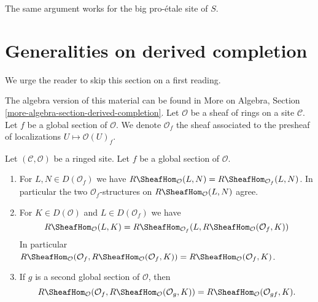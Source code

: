 \medskip\noindent
The same argument works for the big pro-\'etale site of $S$.







\section{Generalities on derived completion}
\label{section-derived-completion}

\noindent
We urge the reader to skip this section on a first reading.

\medskip\noindent
The algebra version of this material can be found in
More on Algebra, Section \ref{more-algebra-section-derived-completion}.
Let $\mathcal{O}$ be a sheaf of rings on a site $\mathcal{C}$.
Let $f$ be a global section of $\mathcal{O}$. We denote
$\mathcal{O}_f$ the sheaf associated to the presheaf of localizations
$U \mapsto \mathcal{O}(U)_f$.

\begin{lemma}
\label{lemma-map-twice-localize}
Let $(\mathcal{C}, \mathcal{O})$ be a ringed site. Let $f$ be a global
section of $\mathcal{O}$.
\begin{enumerate}
\item For $L, N \in D(\mathcal{O}_f)$ we have
$R\SheafHom_\mathcal{O}(L, N) = R\SheafHom_{\mathcal{O}_f}(L, N)$.
In particular the two $\mathcal{O}_f$-structures on
$R\SheafHom_\mathcal{O}(L, N)$ agree.
\item For $K \in D(\mathcal{O})$ and
$L \in D(\mathcal{O}_f)$ we have
$$
R\SheafHom_\mathcal{O}(L, K) =
R\SheafHom_{\mathcal{O}_f}(L, R\SheafHom_\mathcal{O}(\mathcal{O}_f, K))
$$
In particular
$R\SheafHom_\mathcal{O}(\mathcal{O}_f,
R\SheafHom_\mathcal{O}(\mathcal{O}_f, K)) =
R\SheafHom_\mathcal{O}(\mathcal{O}_f, K)$.
\item If $g$ is a second global
section of $\mathcal{O}$, then
$$
R\SheafHom_\mathcal{O}(\mathcal{O}_f, R\SheafHom_\mathcal{O}(\mathcal{O}_g, K))
= R\SheafHom_\mathcal{O}(\mathcal{O}_{gf}, K).
$$
\end{enumerate}
\end{lemma}


